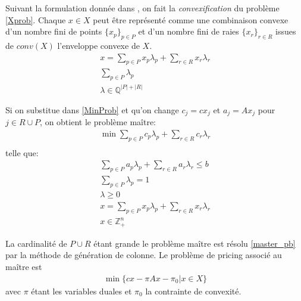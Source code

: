\documentclass[12pt,a4paper,oneside]{book}
\theoremstyle{definition}
\newcommand{\Z}{\mathbb{Z}}
\begin{document}
			Suivant la formulation donnée dans \cite{desrosiers2010branch}, on fait la \textit{convexification} du problème \ref{Xprob}. Chaque $x \in X$ peut être représenté comme une combinaison convexe d'un nombre fini de points $\{x_p\}_{p \in P}$ et d'un nombre fini de raies $\{x_r\}_{r \in R}$ issues de $conv(X)$ l'enveloppe convexe de $X$.
			\begin{gather}
			    x = \sum_{p \in P} x_p \lambda_p  + \sum_{r \in R} x_r \lambda_r \\
			    \sum_{p \in P} \lambda_p \\
			    \lambda \in \mathbb{Q}^{|P|+|R|}
			\end{gather}
			
			Si on substitue dans \ref{MinProb} et qu'on change $c_j = cx_j$ et $a_j = Ax_j$ pour $j \in R \cup P $, on obtient le problème maître:
			\begin{gather} \label{master_pb}
    			\min \sum_{p \in P} c_p \lambda_p + \sum_{r \in R} c_r \lambda_r \\
    		\end{gather}
    		telle que:
    		\begin{gather*}
    		    \sum_{p \in P} a_p \lambda_p + \sum_{r \in R} a_r \lambda_r \leq b \\
    		    \sum_{p \in P} \lambda_p =1 \\
    		    \lambda \geq 0 \\
    		    x = \sum_{p \in P} x_p \lambda_p + \sum_{r \in R} x_r \lambda_r \\
    		    x \in \Z_+^n
    		\end{gather*}
    		
			La cardinalité de $P \cup R$ étant grande le problème maître est résolu \ref{master_pb} par la méthode de génération de colonne. Le problème de pricing associé au maître est
			\begin{gather}
			    \min \{ cx - \pi Ax - \pi_0 | x \in X \}
			\end{gather}
			avec $\pi$ étant les variables duales et $\pi_0$ la contrainte de convexité.
			
			
\end{document}
